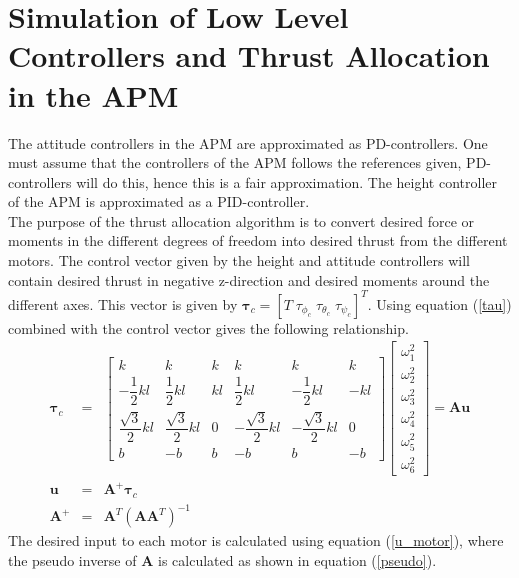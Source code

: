 \section{Simulation of Low Level Controllers and Thrust Allocation in the APM}
The attitude controllers in the APM are approximated as PD-controllers. One must assume that the controllers of the APM follows the references given, PD-controllers will do this, hence this is a fair approximation. The height controller of the APM is approximated as a PID-controller.\\
\newline
The purpose of the thrust allocation algorithm is to convert desired force or moments in the different degrees of freedom into desired thrust from the different motors. The control vector given by the height and attitude controllers will contain desired thrust in negative z-direction and desired moments around the different axes. This vector is given by $\boldsymbol{\tau}_c = [T\; \tau_{\phi_c}\; \tau_{\theta_c}\; \tau_{\psi_c}]^T$. Using equation (\ref{tau}) combined with the control vector gives the following relationship.
\begin{eqnarray}
\boldsymbol{\tau}_{c} &=& \begin{bmatrix}
k & k & k & k & k & k\\
-\dfrac{1}{2}kl & \dfrac{1}{2}kl & kl & \dfrac{1}{2}kl & -\dfrac{1}{2}kl & -kl\\
\dfrac{\sqrt{3}}{2}kl & \dfrac{\sqrt{3}}{2}kl & 0 & -\dfrac{\sqrt{3}}{2}kl & -\dfrac{\sqrt{3}}{2}kl & 0\\
b & -b & b & -b & b & -b
\end{bmatrix}
\begin{bmatrix}
\omega_1^2\\
\omega_2^2\\
\omega_3^2\\
\omega_4^2\\
\omega_5^2\\
\omega_6^2
\end{bmatrix}
= \boldsymbol{A}\boldsymbol{u}\\
\boldsymbol{u} &=& \boldsymbol{A}^+\boldsymbol{\tau}_c \label{u_motor}\\
\boldsymbol{A}^+ &=& \boldsymbol{A}^T(\boldsymbol{A}\boldsymbol{A}^T)^{-1}\label{pseudo}
\end{eqnarray}
The desired input to each motor is calculated using equation (\ref{u_motor}), where the pseudo inverse of $\boldsymbol{A}$ is calculated as shown in equation (\ref{pseudo}).
